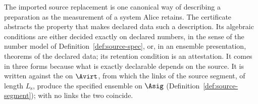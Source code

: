 
The imported source replacement is one canonical way of describing a
preparation as the measurement of a system Alice retains. The certificate
abstracts the property that makes declared data such a description. Its
algebraic conditions are either decided exactly on declared numbers, in the
sense of the number model of Definition~\ref{def:source-spec}, or, in an
ensemble presentation, theorems of the declared data; its retention condition
is an attestation. It comes in three forms because what is exactly declarable
depends on the source. It is written against the
 on $\Avirt$, from which the links of the source segment, of
length $L_{\mathrm s}$, produce the specified ensemble on $\Asig$
(Definition~\ref{def:source-segment}); with no links the two coincide.

